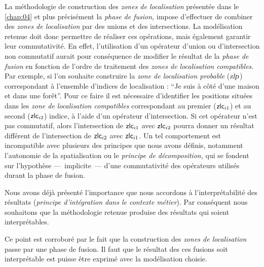 La méthodologie de construction des \emph{zones de localisation}
présentée dans le \autoref{chap:04} et plus précisément la \emph{phase
  de fusion,} impose d'effectuer de combiner des \emph{zones de
  localisation} par des unions et des intersections. La modélisation
retenue doit donc permettre de réaliser ces opérations, mais également
garantir leur commutativité. En effet, l'utilisation d'un opérateur
d'union ou d'intersection non commutatif aurait pour conséquence de
modifier le résultat de la \emph{phase de fusion} en fonction de
l'ordre de traitement des \emph{zones de localisation
  compatibles}. Par exemple, si l'on souhaite construire la \emph{zone
  de localisation probable} ($\text{\textsl{zlp}}$) correspondant à
l'ensemble d'indices de localisation : \enquote{Je suis à côté d'une
  maison et dans une forêt}. Pour ce faire il est nécessaire
d'identifier les positions situées dans les \emph{zone de localisation
  compatibles} correspondant au premier ($\text{\textsf{zlc}}_{i1}$)
et au second ($\text{\textsf{zlc}}_{i2}$) indice, à l'aide d'un
opérateur d'intersection. Si cet opérateur n'est pas commutatif, alors
l'intersection de $\text{\textsf{zlc}}_{i1}$ avec
$\text{\textsf{zlc}}_{i2}$ pourra donner un résultat différent de
l'intersection de $\text{\textsf{zlc}}_{i2}$ avec
$\text{\textsf{zlc}}_{i1}$. Un tel comportement est incompatible avec
plusieurs des principes que nous avons définis, notamment l'autonomie
de la spatialisation ou le \emph{principe de décomposition,} qui se
fondent sur l'hypothèse ---~implicite~--- d'une commutativité des
opérateurs utilisés durant la phase de fusion.


Nous avons déjà présenté l'importance que nous accordons à
l'interprétabilité des résultats (\emph{principe d'intégration dans le
  contexte métier}).
%
Par conséquent nous souhaitons que la méthodologie retenue produise
des résultats qui soient interprétables.


Ce point est corroboré par le fait que la construction des \emph{zones
  de localisation} passe par une phase de fusion.
%
Il faut que le résultat des ces fusions soit interprétable est puisse
être exprimé avec la modélisation choisie.


